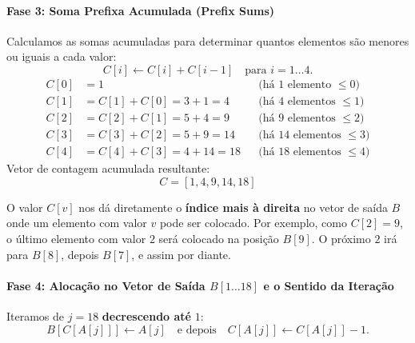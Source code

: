 \documentclass[11pt,a4paper]{article}
\begin{document}
\paragraph{Fase 3: Soma Prefixa Acumulada (Prefix Sums)}
Calculamos as somas acumuladas para determinar quantos elementos são menores ou iguais a cada valor:
\[
C[i] \leftarrow C[i] + C[i-1] \quad \text{para } i = 1 \dots 4.
\]
\begin{align*}
    C[0] &= 1 && \text{(há 1 elemento } \le 0\text{)} \\
    C[1] &= C[1] + C[0] = 3 + 1 = 4 && \text{(há 4 elementos } \le 1\text{)} \\
    C[2] &= C[2] + C[1] = 5 + 4 = 9 && \text{(há 9 elementos } \le 2\text{)} \\
    C[3] &= C[3] + C[2] = 5 + 9 = 14 && \text{(há 14 elementos } \le 3\text{)} \\
    C[4] &= C[4] + C[3] = 4 + 14 = 18 && \text{(há 18 elementos } \le 4\text{)}
\end{align*}
Vetor de contagem acumulada resultante:
\[
C = [1, 4, 9, 14, 18]
\]

\begin{teoria}
O valor $C[v]$ nos dá diretamente o \textbf{índice mais à direita} no vetor de saída $B$ onde um elemento com valor $v$ pode ser colocado.
Por exemplo, como $C[2] = 9$, o último elemento com valor $2$ será colocado na posição $B[9]$. O próximo $2$ irá para $B[8]$, depois $B[7]$, e assim por diante.
\end{teoria}

\paragraph{Fase 4: Alocação no Vetor de Saída $B[1 \dots 18]$ e o Sentido da Iteração}
Iteramos de $j = 18$ \textbf{decrescendo até} $1$:
\[
B[C[A[j]]] \leftarrow A[j] \quad \text{e depois} \quad C[A[j]] \leftarrow C[A[j]] - 1.
\]
\end{document}
